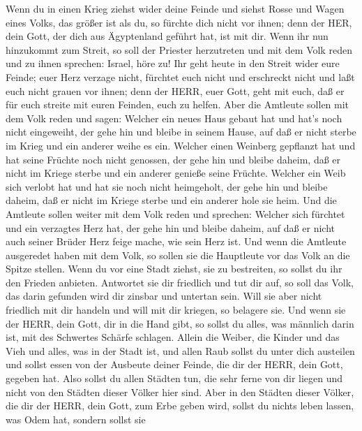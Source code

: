  Wenn du in einen Krieg ziehst wider deine Feinde und siehst
Rosse und Wagen eines Volks, das größer ist als du, so fürchte dich
nicht vor ihnen; denn der HER, dein Gott, der dich aus Ägyptenland
geführt hat, ist mit dir.  Wenn ihr nun hinzukommt zum
Streit, so soll der Priester herzutreten und mit dem Volk reden
 und zu ihnen sprechen: Israel, höre zu! Ihr geht heute in
den Streit wider eure Feinde; euer Herz verzage nicht, fürchtet euch
nicht und erschreckt nicht und laßt euch nicht grauen vor ihnen;
 denn der HERR, euer Gott, geht mit euch, daß er für euch
streite mit euren Feinden, euch zu helfen.  Aber die
Amtleute sollen mit dem Volk reden und sagen: Welcher ein neues Haus
gebaut hat und hat's noch nicht eingeweiht, der gehe hin und bleibe in
seinem Hause, auf daß er nicht sterbe im Krieg und ein anderer weihe es
ein.  Welcher einen Weinberg gepflanzt hat und hat seine
Früchte noch nicht genossen, der gehe hin und bleibe daheim, daß er
nicht im Kriege sterbe und ein anderer genieße seine Früchte.
 Welcher ein Weib sich verlobt hat und hat sie noch nicht
heimgeholt, der gehe hin und bleibe daheim, daß er nicht im Kriege
sterbe und ein anderer hole sie heim.  Und die Amtleute
sollen weiter mit dem Volk reden und sprechen: Welcher sich fürchtet und
ein verzagtes Herz hat, der gehe hin und bleibe daheim, auf daß er nicht
auch seiner Brüder Herz feige mache, wie sein Herz ist.  Und
wenn die Amtleute ausgeredet haben mit dem Volk, so sollen sie die
Hauptleute vor das Volk an die Spitze stellen.  Wenn du vor
eine Stadt ziehst, sie zu bestreiten, so sollst du ihr den Frieden
anbieten.  Antwortet sie dir friedlich und tut dir auf, so
soll das Volk, das darin gefunden wird dir zinsbar und untertan sein.
 Will sie aber nicht friedlich mit dir handeln und will mit
dir kriegen, so belagere sie.  Und wenn sie der HERR, dein
Gott, dir in die Hand gibt, so sollst du alles, was männlich darin ist,
mit des Schwertes Schärfe schlagen.  Allein die Weiber, die
Kinder und das Vieh und alles, was in der Stadt ist, und allen Raub
sollst du unter dich austeilen und sollst essen von der Ausbeute deiner
Feinde, die dir der HERR, dein Gott, gegeben hat.  Also
sollst du allen Städten tun, die sehr ferne von dir liegen und nicht von
den Städten dieser Völker hier sind.  Aber in den Städten
dieser Völker, die dir der HERR, dein Gott, zum Erbe geben wird, sollst
du nichts leben lassen, was Odem hat,  sondern sollst sie
